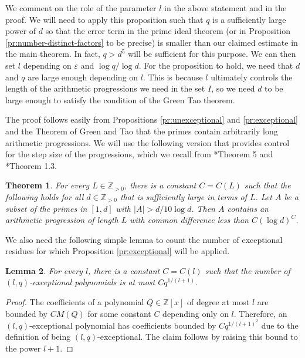 \documentclass[12pt, notitlepage]{amsart}
\numberwithin{equation}{section}
\def\Z{\mathbb Z}
\newtheorem{theorem}{Theorem}[section]
\newtheorem{lemma}[theorem]{Lemma}
\theoremstyle{remark}
\theoremstyle{definition}
\theoremstyle{remark}
\numberwithin{equation}{section}
\newcommand{\e}{\varepsilon}
\begin{document}
We comment on the role of the parameter $l$ in the above statement and in the proof.
We will need to apply this proposition such that $q$ is a sufficiently large
power of $d$ so that the error term in the prime ideal theorem
(or in Proposition \ref{pr:number-distinct-factors} to be precise)
is smaller than our claimed estimate in the main theorem.
In fact, $q> d^5$ will be sufficient for this purpose.
We can then set $l$ depending on $\e$ and $\log q/\log d$.
For the proposition to hold, we need that $d$ and $q$ are large enough depending on $l$.
This is because $l$ ultimately controls the length of the arithmetic progressions
we need in the set $I$, so we need $d$ to be large enough to satisfy
the condition of the Green Tao theorem.


The proof follows easily from Propositions \ref{pr:unexceptional}
and \ref{pr:exceptional} and the
Theorem of Green and Tao \cite{GT} that the primes contain arbitrarily long arithmetic
progressions.
We will use the following version that provides control for the step size
of the progressions, which we recall from \cite{TZ}*{Theorem 5} and
\cite{Sha}*{Theorem 1.3}.


\begin{theorem}\label{th:Green-Tao}
For every $L\in\Z_{>0}$, there is a constant $C=C(L)$ such that the following
holds for all $d\in\Z_{>0}$ that is sufficiently large in terms of $L$.
Let $A$ be a subset of the primes in $[1,d]$ with $|A|>d/10\log d$.
Then $A$ contains an arithmetic progression of length $L$ with common difference
less than $C(\log d)^C$.
\end{theorem}

We also need the following simple lemma to count the number of exceptional residues
for which Proposition \ref{pr:exceptional} will be applied.

\begin{lemma}\label{lm:number-exceptional}
For every $l$, there is a constant $C=C(l)$ such that the number of
$(l,q)$-exceptional polynomials is at most
$Cq^{1/(l+1)}$.
\end{lemma}

\begin{proof}
The coefficients of a polynomial $Q\in\Z[x]$
of degree at most $l$
are bounded by $C M(Q)$ for some constant $C$ depending only on $l$.
Therefore, an $(l,q)$-exceptional polynomial has coefficients bounded by
$Cq^{1/(l+1)^2}$ due to the definition of being $(l, q)$-exceptional. The claim follows by raising this bound to the power $l+1$.
\end{proof}
\end{document}
